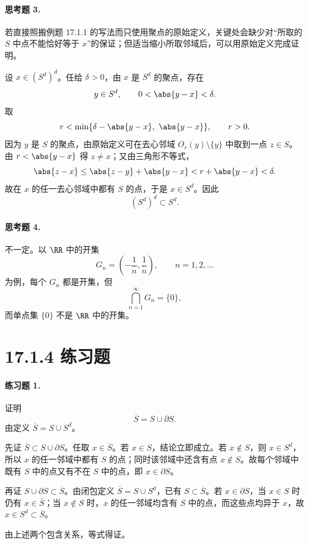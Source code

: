 \paragraph{思考题 3.}
\begin{xsolution}
若直接照搬例题 17.1.1 的写法而只使用聚点的原始定义，关键处会缺少对“所取的 $S$ 中点不能恰好等于 $x$”的保证；但适当缩小所取邻域后，可以用原始定义完成证明。

设 $x\in(S^d)^d$。任给 $\delta>0$，由 $x$ 是 $S^d$ 的聚点，存在
\[
  y\in S^d,\qquad 0<\abs{y-x}<\delta.
\]
取
\[
  r<\min\{\delta-\abs{y-x},\ \abs{y-x}\},
  \qquad r>0.
\]
因为 $y$ 是 $S$ 的聚点，由原始定义可在去心邻域 $O_r(y)\setminus\{y\}$ 中取到一点 $z\in S$。由 $r<\abs{y-x}$ 得 $z\neq x$；又由三角形不等式，
\[
  \abs{z-x}\leq\abs{z-y}+\abs{y-x}
  <r+\abs{y-x}<\delta.
\]
故在 $x$ 的任一去心邻域中都有 $S$ 的点，于是 $x\in S^d$。因此
\[
  (S^d)^d\subset S^d.
\]
\end{xsolution}

\paragraph{思考题 4.}
\begin{xsolution}
不一定。以 $\RR$ 中的开集
\[
  G_n=\left(-\frac1n,\frac1n\right),\qquad n=1,2,\ldots
\]
为例，每个 $G_n$ 都是开集，但
\[
  \bigcap_{n=1}^\infty G_n=\{0\},
\]
而单点集 $\{0\}$ 不是 $\RR$ 中的开集。
\end{xsolution}

\section*{17.1.4 练习题}

\paragraph{练习题 1.}
\begin{xsolution}
证明
\[
  \overline S=S\cup\partial S.
\]
由定义 $\overline S=S\cup S^d$。

先证 $\overline S\subset S\cup\partial S$。任取 $x\in\overline S$。若 $x\in S$，结论立即成立。若 $x\notin S$，则 $x\in S^d$，所以 $x$ 的任一邻域中都有 $S$ 的点；同时该邻域中还含有点 $x\notin S$。故每个邻域中既有 $S$ 中的点又有不在 $S$ 中的点，即 $x\in\partial S$。

再证 $S\cup\partial S\subset\overline S$。由闭包定义 $\overline S=S\cup S^d$，已有 $S\subset\overline S$。若 $x\in\partial S$，当 $x\in S$ 时仍有 $x\in\overline S$；当 $x\notin S$ 时，$x$ 的任一邻域均含有 $S$ 中的点，而这些点均异于 $x$，故 $x\in S^d\subset\overline S$。

由上述两个包含关系，等式得证。
\end{xsolution}

